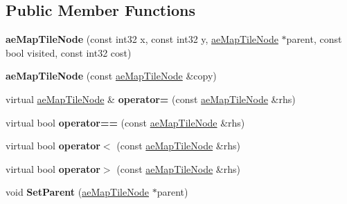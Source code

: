 \subsection*{Public Member Functions}
\begin{DoxyCompactItemize}
\item 
{\bfseries ae\+Map\+Tile\+Node} (const int32 x, const int32 y, \hyperlink{classae_map_tile_node}{ae\+Map\+Tile\+Node} $\ast$parent, const bool visited, const int32 cost)\hypertarget{classae_map_tile_node_a476b29ad543cb1c001f4117da3bc04c9}{}\label{classae_map_tile_node_a476b29ad543cb1c001f4117da3bc04c9}

\item 
{\bfseries ae\+Map\+Tile\+Node} (const \hyperlink{classae_map_tile_node}{ae\+Map\+Tile\+Node} \&copy)\hypertarget{classae_map_tile_node_a7f77906699c1648ec41acce383044fcf}{}\label{classae_map_tile_node_a7f77906699c1648ec41acce383044fcf}

\item 
virtual \hyperlink{classae_map_tile_node}{ae\+Map\+Tile\+Node} \& {\bfseries operator=} (const \hyperlink{classae_map_tile_node}{ae\+Map\+Tile\+Node} \&rhs)\hypertarget{classae_map_tile_node_a8e092f03e147e59a721f418ac01bda79}{}\label{classae_map_tile_node_a8e092f03e147e59a721f418ac01bda79}

\item 
virtual bool {\bfseries operator==} (const \hyperlink{classae_map_tile_node}{ae\+Map\+Tile\+Node} \&rhs)\hypertarget{classae_map_tile_node_a5c968db5b5580d8c0b6be554418d9c30}{}\label{classae_map_tile_node_a5c968db5b5580d8c0b6be554418d9c30}

\item 
virtual bool {\bfseries operator$<$} (const \hyperlink{classae_map_tile_node}{ae\+Map\+Tile\+Node} \&rhs)\hypertarget{classae_map_tile_node_a73cd36e1fa79e1486bdfc3480c27711d}{}\label{classae_map_tile_node_a73cd36e1fa79e1486bdfc3480c27711d}

\item 
virtual bool {\bfseries operator$>$} (const \hyperlink{classae_map_tile_node}{ae\+Map\+Tile\+Node} \&rhs)\hypertarget{classae_map_tile_node_af2f48e1ef88b17c57d420a4cc565ccde}{}\label{classae_map_tile_node_af2f48e1ef88b17c57d420a4cc565ccde}

\item 
void {\bfseries Set\+Parent} (\hyperlink{classae_map_tile_node}{ae\+Map\+Tile\+Node} $\ast$parent)\hypertarget{classae_map_tile_node_aa4cb85eddd3946b7f3bf2908487391bd}{}\label{classae_map_tile_node_aa4cb85eddd3946b7f3bf2908487391bd}


\end{DoxyCompactItemize}
